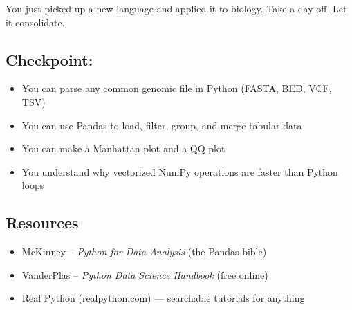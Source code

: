 \begin{restbox}
You just picked up a new language and applied it to biology. Take a day off. Let it consolidate.
\end{restbox}

\subsection{Checkpoint:}
\begin{itemize}[nosep]
  \item You can parse any common genomic file in Python (FASTA, BED, VCF, TSV)
  \item You can use Pandas to load, filter, group, and merge tabular data
  \item You can make a Manhattan plot and a QQ plot
  \item You understand why vectorized NumPy operations are faster than Python loops
\end{itemize}

\subsection{Resources}
\begin{itemize}[nosep]
  \item McKinney -- \textit{Python for Data Analysis} (the Pandas bible)
  \item VanderPlas -- \textit{Python Data Science Handbook} (free online)
  \item Real Python (realpython.com) --- searchable tutorials for anything
\end{itemize}
